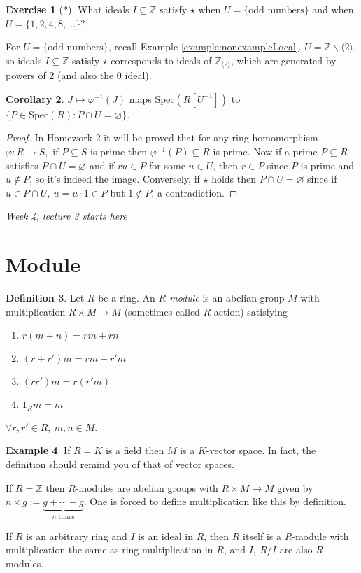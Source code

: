 \documentclass[a4paper]{article}
\newcommand{\la}{\langle}
\newcommand{\ra}{\rangle}
\newcommand{\Z}{\mathbb Z}
\newcommand{\Spec}{\text{Spec}}
\theoremstyle{definition}
\newtheorem{defn}{Definition}[subsection]
\newtheorem{coro}[defn]{Corollary}
\newtheorem{example}[defn]{Example}
\newtheorem{exe}[defn]{Exercise}
\begin{document}
\begin{exe}[$\ast$]
What ideals $I\subseteq \Z$ satisfy $\star$ when $U=\{\text{odd numbers}\}$ and when $U=\{1,2,4,8,\ldots\}$?

For $U=\{\text{odd numbers}\}$, recall Example \ref{example:nonexampleLocal}. $U=\Z\backslash \la2\ra$, so ideals $I\subseteq \Z$ satisfy $\star$ corresponds to ideals of $\Z_{\la 2\ra}$, which are generated by powers of 2 (and also the 0 ideal).
\end{exe}

\begin{coro}
$J\mapsto \varphi^{-1}(J)$ maps $\Spec(R[U^{-1}])$ to $\{P\in\Spec(R):P\cap U=\varnothing\}$.
\end{coro}

\begin{proof}
In Homework 2 it will be proved that for any ring homomorphism $\varphi:R\rightarrow S,$ if $P\subseteq S$ is prime then $\varphi^{-1}(P)\subseteq R$ is prime. Now if a prime $P\subseteq R$ satisfies $P\cap U=\varnothing$ and if $ru\in P$ for some $u\in U$, then $r\in P$ since $P$ is prime and $u\notin P$, so it's indeed the image. Conversely, if $\star$ holds then $P\cap U=\varnothing$ since if $u\in P\cap U,\ u=u\cdot 1\in P$ but $1\notin P$, a contradiction.
\end{proof}

\begin{flushright}
\textit{Week 4, lecture 3 starts here}
\end{flushright}

\section{Module}
\begin{defn}
Let $R$ be a ring. An $R$\textit{-module} is an abelian group $M$ with multiplication $R\times M\rightarrow M$ (sometimes called $R$-action) satisfying
\begin{enumerate}
\item $r(m+n)=rm+rn$ 
\item $(r+r')m=rm+r'm$
\item $(rr')m=r(r'm)$
\item $1_R m=m$
\end{enumerate}
$\forall r,r'\in R,\ m,n\in M$.
\end{defn}

\begin{example}
If $R=K$ is a field then $M$ is a $K$-vector space. In fact, the definition should remind you of that of vector spaces.

If $R=\Z$ then $R$-modules are abelian groups with $R\times M\rightarrow M$ given by $n\times g:=\underbrace{g+\cdots+g}_{n\text{ times}}$. One is forced to define multiplication like this by definition.

If $R$ is an arbitrary ring and $I$ is an ideal in $R$, then $R$ itself is a $R$-module with multiplication the same as ring multiplication in $R$, and $I,\ R/I$ are also $R$-modules.
\end{example}
\end{document}
